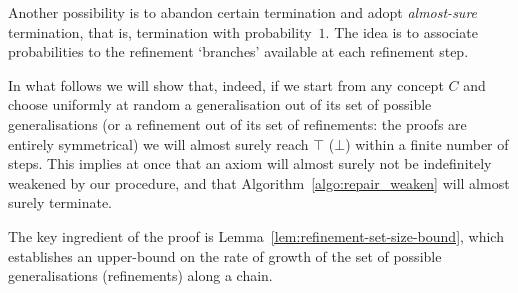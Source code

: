 \documentclass[
]{ceurart}
\begin{document}
Another possibility is to abandon certain termination and adopt \emph{almost-sure} termination, that is, termination with probability~$1$.
%
The idea is to associate probabilities to the refinement `branches' available at each refinement step.
%

In what follows we will show that, indeed, if we start from any concept $C$ and  choose uniformly at random a generalisation out of its set of possible generalisations (or a refinement out of its set of refinements: the proofs are entirely symmetrical) we will almost surely reach $\top$ ($\bot$) within a finite number of steps. This implies at once that an axiom will almost surely not be indefinitely weakened by our procedure, and that Algorithm~\ref{algo:repair_weaken} will almost surely terminate. 

The key ingredient of the proof is Lemma~\ref{lem:refinement-set-size-bound}, which establishes an upper-bound on the rate of growth of the set of possible generalisations (refinements) along a chain.
\end{document}

